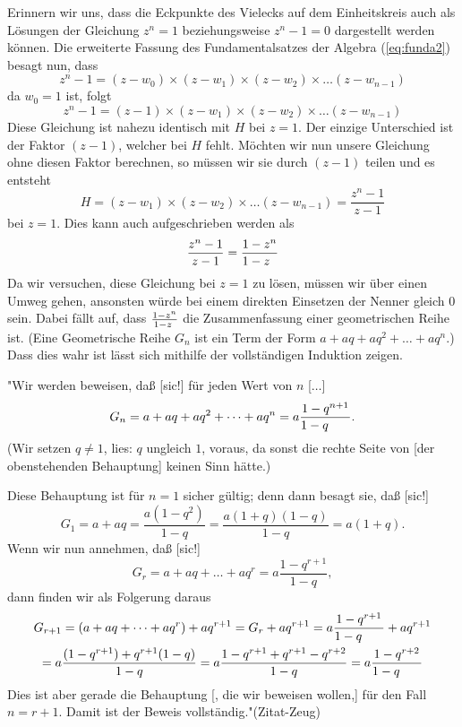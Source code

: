 \documentclass[a4paper,12pt]{article} %
\begin{document}
Erinnern wir uns, dass die Eckpunkte des Vielecks auf dem Einheitskreis auch als Lösungen der Gleichung $z^n=1$ beziehungsweise $z^n-1=0$ dargestellt werden können. Die erweiterte Fassung des Fundamentalsatzes der Algebra (\ref{eq:funda2}) besagt nun, dass
\[z^n-1=(z-w_0)\times(z-w_1)\times(z-w_2)\times\dots(z-w_{n-1})\]
da $w_0=1$ ist, folgt
\[z^n-1=(z-1)\times(z-w_1)\times(z-w_2)\times\dots(z-w_{n-1})\]
Diese Gleichung ist nahezu identisch mit $H$ bei $z=1$.
Der einzige Unterschied ist der Faktor $(z-1)$, welcher bei $H$ fehlt.
Möchten wir nun unsere Gleichung ohne diesen Faktor berechnen, so müssen wir sie durch $(z-1)$ teilen und es entsteht
\begin{equation}\label{frac}
	H=(z-w_1)\times(z-w_2)\times\dots(z-w_{n-1})=\frac{z^n-1}{z-1}
\end{equation}
bei $z=1$. Dies kann auch aufgeschrieben werden als
\[\frac{z^n-1}{z-1}=\frac{1-z^n}{1-z\hspace{2mm}}\]
Da wir versuchen, diese Gleichung bei $z=1$ zu lösen, müssen wir über einen Umweg gehen, ansonsten würde bei einem direkten Einsetzen der Nenner gleich $0$ sein.
Dabei fällt auf, dass $\frac{1-z^n}{1-z\hspace{1mm}}$ die Zusammenfassung einer geometrischen Reihe ist.
(Eine Geometrische Reihe $G_n$ ist ein Term der Form $a+aq+aq^2+\dots+aq^n$.)
Dass dies wahr ist lässt sich mithilfe der vollständigen Induktion zeigen.

"Wir werden beweisen, daß [sic!] für jeden Wert von $n$ [$\dots$]
\begin{equation}
	G_n=a+aq+aq^2+\dots+aq^n=a\frac{1-q^{n+1}}{1-q\hspace{6mm}}.
\end{equation} 
(Wir setzen $q\ne1$, lies: $q$ ungleich $1$, voraus, da sonst die rechte Seite von [der obenstehenden Behauptung] keinen Sinn hätte.)

Diese Behauptung ist für $n=1$ sicher gültig; denn dann besagt sie, daß [sic!]
\[G_1=a+aq=\frac{a(1-q^2)}{1-q}=\frac{a(1+q)(1-q)}{1-q}=a(1+q).\]
Wenn wir nun annehmen, daß [sic!]
\[G_r=a+aq+\dots+aq^r=a\frac{1-q^{r+1}}{1-q},\]
dann finden wir als Folgerung daraus
\begin{multline}
	G_{r+1}=(a+aq+\dots+aq^r)+aq^{r+1}=G_r+aq^{r+1}=a\frac{1-q^{r+1}}{1-q\hspace{6mm}}+aq^{r+1}\\
	=a\frac{(1-q^{r+1})+q^{r+1}(1-q)}{1-q}=a\frac{1-q^{r+1}+q^{r+1}-q^{r+2}}{1-q}=a\frac{1-q^{r+2}}{1-q\hspace{6mm}}
\end{multline}
Dies ist aber gerade die Behauptung [, die wir beweisen wollen,] für den Fall $n=r+1$. Damit ist der Beweis vollständig."(Zitat-Zeug)
\end{document}
